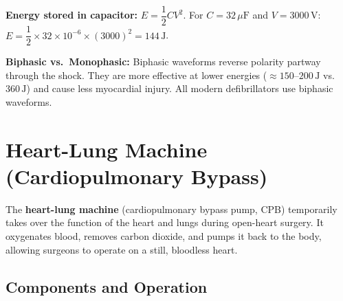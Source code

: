 \documentclass[12pt,a4paper]{article}
\begin{document}
\textbf{Energy stored in capacitor:} $E = \dfrac{1}{2}CV^2$. For $C = 32\,\mu\text{F}$ and $V = 3000\,\text{V}$: $E = \dfrac{1}{2}\times 32\times10^{-6}\times(3000)^2 = 144\,\text{J}$.

\textbf{Biphasic vs.\ Monophasic:} Biphasic waveforms reverse polarity partway through the shock. They are more effective at lower energies ($\approx 150$--$200\,\text{J}$ vs.\ $360\,\text{J}$) and cause less myocardial injury. All modern defibrillators use biphasic waveforms.

\section{Heart-Lung Machine (Cardiopulmonary Bypass)}

\begin{tcolorbox}[defbox, title={\textbf{Heart-Lung Machine}}]
The \textbf{heart-lung machine} (cardiopulmonary bypass pump, CPB) temporarily takes over the function of the heart and lungs during open-heart surgery. It oxygenates blood, removes carbon dioxide, and pumps it back to the body, allowing surgeons to operate on a still, bloodless heart.
\end{tcolorbox}

\subsection{Components and Operation}
\end{document}
